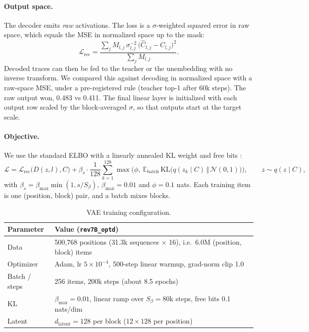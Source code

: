 \documentclass[11pt]{article}
\newcommand{\E}{\mathbb{E}}
\newcommand{\KL}{\mathrm{KL}}
\newcommand{\N}{\mathcal{N}}
\begin{document}
\paragraph{Output space.} The decoder emits \emph{raw} activations. The loss is a $\sigma$-weighted squared error in raw
space, which equals the MSE in normalized space up to the mask:
\begin{equation}
  \mathcal{L}_{\text{rec}} = \frac{\sum_j M_{l,j}\,\sigma_{l,j}^{-2}\,\big(\hat C_{l,j} - C_{l,j}\big)^2}{\sum_j M_{l,j}} .
\end{equation}
Decoded traces can then be fed to the teacher or the unembedding with no inverse transform. We compared this against
decoding in normalized space with a raw-space MSE, under a pre-registered rule (teacher top-1 after 60k steps). The raw
output won, 0.483 vs 0.411. The final linear layer is initialized with each output row scaled by the
block-averaged $\sigma$, so that outputs start at the target scale.

\paragraph{Objective.} We use the standard ELBO with a linearly annealed KL weight \citep{kingma2014vae,bowman2016generating}
and free bits \citep{kingma2016iaf}:
\begin{equation}
  \mathcal{L} = \mathcal{L}_{\text{rec}}\big(D(z, l), C\big) + \beta_s \cdot \frac{1}{128}\sum_{k=1}^{128}
  \max\!\Big(\phi,\ \E_{\text{batch}}\,\KL\big(q(z_k\mid C)\,\Vert\,\N(0,1)\big)\Big),
  \qquad z \sim q(z\mid C),
\end{equation}
with $\beta_s = \beta_{\max}\min(1, s/S_\beta)$, $\beta_{\max} = 0.01$ and $\phi = 0.1$ nats. Each training item is one
(position, block) pair, and a batch mixes blocks.

\begin{table}[h]
  \centering\small
  \begin{tabular}{@{}ll@{}}
    \toprule
    Parameter & Value (\texttt{rev7B\_optd}) \\
    \midrule
    Data & 500{,}768 positions (31.3k sequences $\times$ 16), i.e.\ 6.0M (position, block) items \\
    Optimizer & Adam, lr $5\times10^{-4}$, 500-step linear warmup, grad-norm clip 1.0 \\
    Batch / steps & 256 items, 200k steps (about 8.5 epochs) \\
    KL & $\beta_{\max} = 0.01$, linear ramp over $S_\beta = 80$k steps, free bits 0.1 nats/dim \\
    Latent & $d_{\text{latent}} = 128$ per block ($12\times128$ per position) \\
    \bottomrule
  \end{tabular}
  \caption{VAE training configuration.}
  \label{tab:vae-config}
\end{table}
\end{document}
